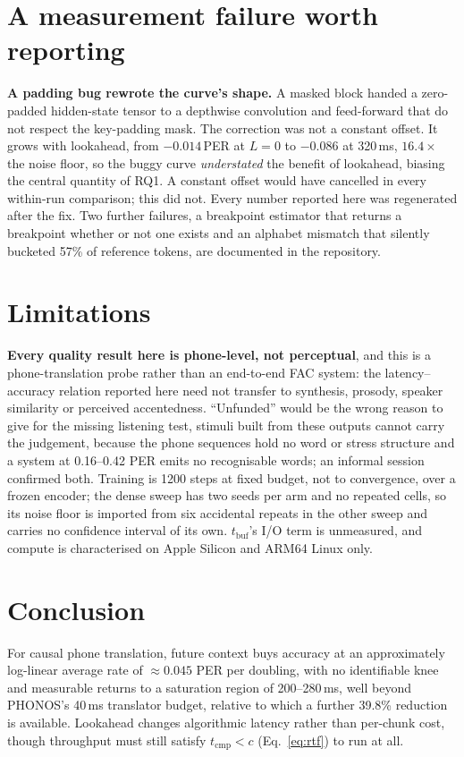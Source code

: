 \documentclass{article}
\newcommand{\tcmp}{\ensuremath{t_{\mathrm{cmp}}}}
\newcommand{\tbuf}{\ensuremath{t_{\mathrm{buf}}}}
\begin{document}
\section{A measurement failure worth reporting}
\label{sec:lessons}

\textbf{A padding bug rewrote the curve's shape.} A masked block handed a
zero-padded hidden-state tensor to a depthwise convolution and feed-forward
that do not respect the key-padding mask. The correction was not a constant
offset. It grows with lookahead, from $-0.014$\,PER at $L{=}0$ to $-0.086$
at 320\,ms, $16.4\times$ the noise floor, so the buggy curve
\emph{understated} the benefit of lookahead, biasing the central quantity of
RQ1. A constant offset would have cancelled in every within-run comparison;
this did not. Every number reported here was regenerated after the fix. Two
further failures, a breakpoint estimator that returns a breakpoint whether or
not one exists and an alphabet mismatch that silently bucketed 57\% of
reference tokens, are documented in the repository.

\section{Limitations}

\textbf{Every quality result here is phone-level, not perceptual}, and this is
a phone-translation probe rather than an end-to-end FAC system: the
latency--accuracy relation reported here need not transfer to synthesis,
prosody, speaker similarity or perceived accentedness. ``Unfunded'' would be
the wrong reason to give for the missing listening test, stimuli built from
these outputs cannot carry the judgement, because the phone sequences hold no
word or stress structure and a system at 0.16--0.42 PER emits no recognisable
words; an informal session confirmed both. Training is 1200 steps at fixed
budget, not to convergence, over a frozen encoder; the dense sweep has two
seeds per arm and no repeated cells, so its noise floor is imported from six
accidental repeats in the other sweep and carries no confidence interval of its
own. \tbuf{}'s I/O term is unmeasured, and compute is characterised on Apple
Silicon and ARM64 Linux only.

\section{Conclusion}

For causal phone translation, future context buys accuracy at an approximately
log-linear average rate of ${\approx}0.045$ PER per doubling, with no
identifiable knee and measurable returns to a saturation region of
200--280\,ms, well beyond PHONOS's 40\,ms translator budget, relative to
which a further 39.8\% reduction is available. Lookahead changes algorithmic
latency rather than per-chunk cost, though throughput must still satisfy
$\tcmp<c$ (Eq.~\ref{eq:rtf}) to run at all.
\end{document}
